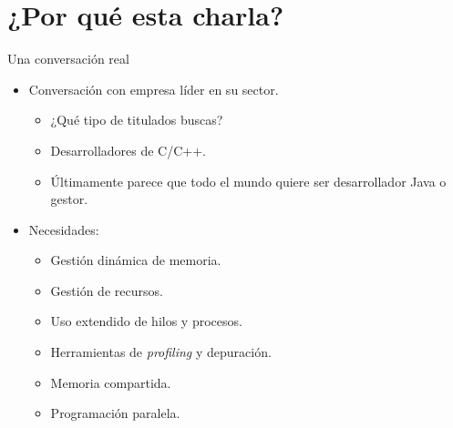 \section{¿Por qué esta charla?}

\begin{frame}[t]{Una conversación real}
  \begin{itemize}
    \item Conversación con empresa líder en su sector.
      \begin{itemize}
        \item ¿Qué tipo de titulados buscas?
        \item Desarrolladores de C/C++.
        \item Últimamente parece que todo el mundo quiere ser desarrollador Java o gestor.
      \end{itemize}
    \item \pause Necesidades:
      \begin{itemize}
        \item Gestión dinámica de memoria.
        \item Gestión de recursos.
        \item Uso extendido de hilos y procesos.
        \item Herramientas de \emph{profiling} y depuración.
        \item Memoria compartida.
        \item Programación paralela.
      \end{itemize}
  \end{itemize}
\end{frame}

